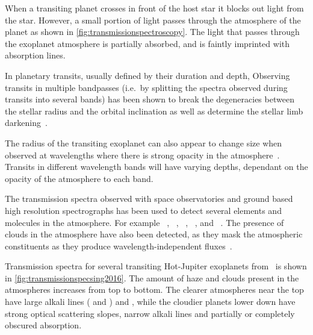 When a transiting planet crosses in front of the host star it blocks out light from the star.
However, a small portion of light passes through the atmosphere of the planet as shown in \cref{fig:transmissionspectroscopy}.
The light that passes through the exoplanet atmosphere is partially absorbed, and is faintly imprinted with absorption lines.


In planetary transits, usually defined by their duration and depth, 
Observing transits in multiple bandpasses (i.e.\ by splitting the spectra observed during transits into several bands) has been shown to break the degeneracies between the stellar radius and the orbital inclination as well as determine the stellar limb darkening~\citep{jha_multicolor_2000, knutson_using_2007}.

The radius of the transiting exoplanet can also appear to change size when observed at wavelengths where there is strong opacity in the atmosphere~\citep[e.g.][]{burrows_radii_2000, seager_theoretical_2000}.
Transits in different wavelength bands will have varying depths, dependant on the opacity of the atmosphere to each band. 

The transmission spectra observed with space observatories and ground based high resolution spectrographs has been used to detect several elements and molecules in the atmosphere.
For example ~\citep{charbonneau_detection_2002, redfield_sodium_2008, wyttenbach_spectrally_2015, nikolov_vlt_2016}, ~\citep{tinetti_water_2007, brogi_carbon_2014}, ~\citep{brogi_carbon_2014, snellen_mass_2018}, ~\citep{redfield_extrasolar_2010},  and ~\citep{hoeijmakers_atomic_2018}.
The presence of clouds in the atmosphere have also been detected, as they mask the atmospheric constituents as they produce wavelength-independent fluxes~\citep[e.g.][]{barman_clouds_2011, kreidberg_clouds_2014, sing_continuum_2016}.

Transmission spectra for several transiting Hot-Jupiter exoplanets from~\citet{sing_continuum_2016} is shown in \cref{fig:transmissionspecsing2016}.
The amount of haze and clouds present in the atmospheres increases from top to bottom. 
The clearer atmospheres near the top have large alkali lines ( and ) and , while the cloudier planets lower down have strong optical scattering slopes, narrow alkali lines and partially or completely obscured  absorption.

